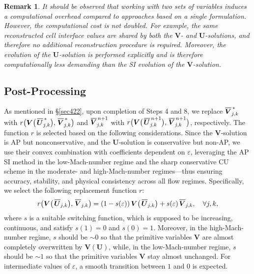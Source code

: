 \documentclass[preprint,12pt]{elsarticle}
\newtheorem{remark}{Remark}[section]
\newcommand{\ve}{\varepsilon}
\newcommand*\xbar[1]{%
	\hbox{%
		\vbox{%
			\hrule height 0.5pt %
			\kern0.4ex%
			\hbox{%
				\kern-0.05em%
				\ensuremath{#1}%
				\kern-0.00em%
			}%
		}%
	}%
}
\begin{document}
{\color{black}
	\begin{remark}
		It should be observed that working with two sets of variables induces a computational overhead compared to approaches based on a single
		formulation. However, the computational cost is not doubled. For example, the same reconstructed cell interface values are shared by both
		the $\bm V$- and $\bm U$-solutions, and therefore no additional reconstruction procedure is required. Moreover, the evolution of the
		$\bm U$-solution is performed explicitly and is therefore computationally less demanding than the SI evolution of the $\bm V$-solution.
	\end{remark}
}

\subsection{Post-Processing}\label{sec43}
{\color{black}As mentioned in \S\ref{sec422},} upon completion of Steps 4 and 8, we {\color{black}replace $\xbar{\bm V}^{\,*}_{j,k}$ with
	$r\big(\bm V\big(\,\xbar{\bm U}^{\,*}_{j,k}\big),\,\xbar{\bm V}^{\,*}_{j,k}\big)$ and $\xbar{\bm V}^{\,n+1}_{j,k}$ with
	$r\big(\bm V\big(\,\xbar{\bm U}^{\,n+1}_{j,k}\big),\,\xbar{\bm V}^{\,n+1}_{j,k}\big)$, respectively. The function $r$ is selected based on
	the following considerations. Since the $\bm V$-solution is AP but nonconservative, and the $\bm U$-solution is conservative but non-AP, we
	use} their convex combination with coefficients dependent on $\ve$, leveraging the AP SI method in the low-Mach-number regime and the sharp
conservative CU scheme in the moderate- and high-Mach-number regimes---thus ensuring accuracy, stability, and physical consistency across
all flow regimes. Specifically, we select the following replacement function $r$:
\begin{equation}
	r\big(\bm V\big(\,\xbar{\bm U}_{j,k}\big),\,\xbar{\bm V}_{j,k}\big)=
	(1-s(\ve))\,\bm V\big(\,\xbar{\bm U}_{j,k}\big)+s(\ve)\,\xbar{\bm V}_{j,k},\quad\forall j,k,
	\label{star}
\end{equation}
where $s$ is a suitable switching function, which is supposed to be increasing, continuous, and satisfy $s(1)=0$ and $s(0)=1$. Moreover,
in the high-Mach-number regime, $s$ should be $\sim0$ so that the primitive variables $\bm V$ are almost completely overwritten by
$\bm V(\bm U)$, while, in the low-Mach-number regime, $s$ should be $\sim1$ so that the primitive variables $\bm V$ stay almost unchanged.
For intermediate values of $\ve$, a smooth transition between $1$ and $0$ is expected.
\end{document}
